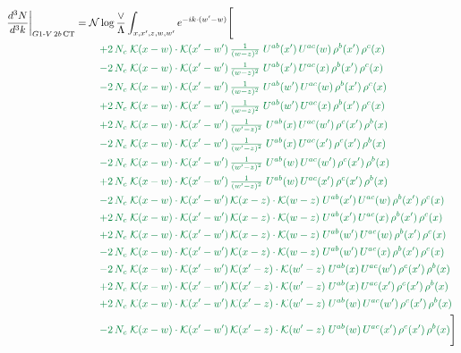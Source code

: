 \documentclass[10pt]{article}
\numberwithin{equation}{section}
\newcommand{\NN}{\mathcal N\log\frac{\vee}{\Lambda}}
\begin{document}
\begin{align}
\frac{d^3N}{d^3k}\bigg|_{G1\text{-}V\,2b\,{\rm CT}}={}&\NN\int_{x,x',z,w,w'}e^{-ik\cdot(w'-w)}\Bigg[\notag\\
&\quad{\color{JIM}+2\,N_c\;\mathcal{K}(x-w)\cdot\mathcal{K}(x'-w')\,\tfrac{1}{(w-z)^{2}}\;U^{ab}(x')\,U^{ac}(w)\,\rho^{b}(x')\,\rho^{c}(x)}\notag\\
&\quad{\color{JIM}-2\,N_c\;\mathcal{K}(x-w)\cdot\mathcal{K}(x'-w')\,\tfrac{1}{(w-z)^{2}}\;U^{ab}(x')\,U^{ac}(x)\,\rho^{b}(x')\,\rho^{c}(x)}\notag\\
&\quad{\color{JIM}-2\,N_c\;\mathcal{K}(x-w)\cdot\mathcal{K}(x'-w')\,\tfrac{1}{(w-z)^{2}}\;U^{ab}(w')\,U^{ac}(w)\,\rho^{b}(x')\,\rho^{c}(x)}\notag\\
&\quad{\color{JIM}+2\,N_c\;\mathcal{K}(x-w)\cdot\mathcal{K}(x'-w')\,\tfrac{1}{(w-z)^{2}}\;U^{ab}(w')\,U^{ac}(x)\,\rho^{b}(x')\,\rho^{c}(x)}\notag\\
&\quad{\color{JIM}+2\,N_c\;\mathcal{K}(x-w)\cdot\mathcal{K}(x'-w')\,\tfrac{1}{(w'-z)^{2}}\;U^{ab}(x)\,U^{ac}(w')\,\rho^{c}(x')\,\rho^{b}(x)}\notag\\
&\quad{\color{JIM}-2\,N_c\;\mathcal{K}(x-w)\cdot\mathcal{K}(x'-w')\,\tfrac{1}{(w'-z)^{2}}\;U^{ab}(x)\,U^{ac}(x')\,\rho^{c}(x')\,\rho^{b}(x)}\notag\\
&\quad{\color{JIM}-2\,N_c\;\mathcal{K}(x-w)\cdot\mathcal{K}(x'-w')\,\tfrac{1}{(w'-z)^{2}}\;U^{ab}(w)\,U^{ac}(w')\,\rho^{c}(x')\,\rho^{b}(x)}\notag\\
&\quad{\color{JIM}+2\,N_c\;\mathcal{K}(x-w)\cdot\mathcal{K}(x'-w')\,\tfrac{1}{(w'-z)^{2}}\;U^{ab}(w)\,U^{ac}(x')\,\rho^{c}(x')\,\rho^{b}(x)}\notag\\
&\quad{\color{JIM}-2\,N_c\;\mathcal{K}(x-w)\cdot\mathcal{K}(x'-w')\,\mathcal{K}(x-z)\cdot\mathcal{K}(w-z)\;U^{ab}(x')\,U^{ac}(w)\,\rho^{b}(x')\,\rho^{c}(x)}\notag\\
&\quad{\color{JIM}+2\,N_c\;\mathcal{K}(x-w)\cdot\mathcal{K}(x'-w')\,\mathcal{K}(x-z)\cdot\mathcal{K}(w-z)\;U^{ab}(x')\,U^{ac}(x)\,\rho^{b}(x')\,\rho^{c}(x)}\notag\\
&\quad{\color{JIM}+2\,N_c\;\mathcal{K}(x-w)\cdot\mathcal{K}(x'-w')\,\mathcal{K}(x-z)\cdot\mathcal{K}(w-z)\;U^{ab}(w')\,U^{ac}(w)\,\rho^{b}(x')\,\rho^{c}(x)}\notag\\
&\quad{\color{JIM}-2\,N_c\;\mathcal{K}(x-w)\cdot\mathcal{K}(x'-w')\,\mathcal{K}(x-z)\cdot\mathcal{K}(w-z)\;U^{ab}(w')\,U^{ac}(x)\,\rho^{b}(x')\,\rho^{c}(x)}\notag\\
&\quad{\color{JIM}-2\,N_c\;\mathcal{K}(x-w)\cdot\mathcal{K}(x'-w')\,\mathcal{K}(x'-z)\cdot\mathcal{K}(w'-z)\;U^{ab}(x)\,U^{ac}(w')\,\rho^{c}(x')\,\rho^{b}(x)}\notag\\
&\quad{\color{JIM}+2\,N_c\;\mathcal{K}(x-w)\cdot\mathcal{K}(x'-w')\,\mathcal{K}(x'-z)\cdot\mathcal{K}(w'-z)\;U^{ab}(x)\,U^{ac}(x')\,\rho^{c}(x')\,\rho^{b}(x)}\notag\\
&\quad{\color{JIM}+2\,N_c\;\mathcal{K}(x-w)\cdot\mathcal{K}(x'-w')\,\mathcal{K}(x'-z)\cdot\mathcal{K}(w'-z)\;U^{ab}(w)\,U^{ac}(w')\,\rho^{c}(x')\,\rho^{b}(x)}\notag\\
&\quad{\color{JIM}-2\,N_c\;\mathcal{K}(x-w)\cdot\mathcal{K}(x'-w')\,\mathcal{K}(x'-z)\cdot\mathcal{K}(w'-z)\;U^{ab}(w)\,U^{ac}(x')\,\rho^{c}(x')\,\rho^{b}(x)}\Bigg]\label{eq:gen4}
\end{align}
\end{document}
